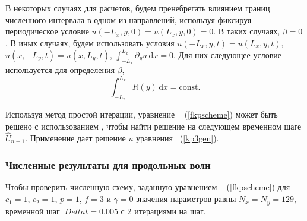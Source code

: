 В некоторых случаях для расчетов, будем пренебрегать влиянием границ численного интервала в одном из направлений, используя фиксируя периодическое условие $u (-L_x, y, 0) = u (L_x, y, 0) = 0$. В таких случаях, $\beta = 0$. В иных случаях, будем использовать условия $ u (-L_x, y, t) = u (L_x, y, t) $, $ u (x, -L_y, t) = u (x, L_y, t) $, $\int_{-L_x}^{L_x} \partial_y u \,\mathrm{d}x = 0$. Для них следующее условие используется для определения $ \beta $,
\begin{equation}
	\label{condperidoic}
	\int_{-L_x}^{L_x} R(y)\, \mathrm{d}x = \text{const}. 
\end{equation}

Используя метод простой итерации, уравнение ~ (\ref{fkpscheme}) может быть решено с использованием , чтобы найти решение на следующем временном шаге $ \hat {U}_{n + 1} $. Применение  дает решение $ u $ уравнения ~(\ref{kp3gen}).

\subsubsection{Численные результаты для продольных волн}

Чтобы проверить численную схему, заданную уравнением ~ (\ref {fkpscheme}) для $c_1 = 1$, $c_2 = 1$, $p = 1$, $f = 3$ и $\gamma = 0$ значения параметров равны $N_x = N_y = 129$, временной шаг $\ Delta t = 0.005$ с 2 итерациями на шаг.

